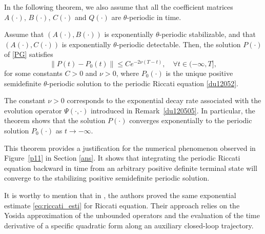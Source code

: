 \documentclass{IEEEtran}
\begin{document}
	In the following theorem, we also assume that all the coefficient matrices $A(\cdot),\,B(\cdot),\,C(\cdot)$ and $Q(\cdot)$ are $\theta$-periodic in time.
	\begin{theorem}\label{thm:analy_riccati}
		Assume that $(A(\cdot),B(\cdot))$ is exponentially $\theta$-periodic stabilizable, and that $(A(\cdot),C(\cdot))$ is exponentially $\theta$-periodic detectable. Then, the solution $P(\cdot)$ of \eqref{PG} satisfies 
		\begin{equation}\label{eq:riccati_esti}
			\|P(t)-P_0(t)\|\leq C e^{-2\nu(T-t)}, \quad \forall t \in (-\infty, T],
		\end{equation}
		for some constants $C>0$ and $\nu>0$, where $P_0(\cdot)$ is the unique positive semidefinite $\theta$-periodic solution to the periodic Riccati equation \eqref{du12052}.
	\end{theorem}
	\begin{remark}
		The constant $\nu>0$ corresponds to the exponential decay rate associated with the evolution operator $\Psi(\cdot,\cdot)$ introduced in Remark~\ref{du120505}. In particular, the theorem shows that the solution $P(\cdot)$ converges exponentially to the periodic solution $P_0(\cdot)$ as $t\to -\infty$.
	\end{remark}
	\begin{remark}
		This theorem provides a justification for the numerical phenomenon observed in Figure~\ref{p11} in Section \ref{ans}. It shows that integrating the periodic Riccati equation backward in time from an arbitrary positive definite terminal state will converge to the stabilizing positive semidefinite periodic solution.
	\end{remark}
	\begin{remark}
		It is worthy to mention that in \cite[Proposition~3.1]{TZZ2}, the authors proved the same exponential estimate \eqref{eq:riccati_esti} for Riccati equation. Their approach relies on the Yosida approximation of the unbounded operators and the evaluation of the time derivative of a specific quadratic form along an auxiliary closed-loop trajectory. 
	\end{remark}
\end{document}

